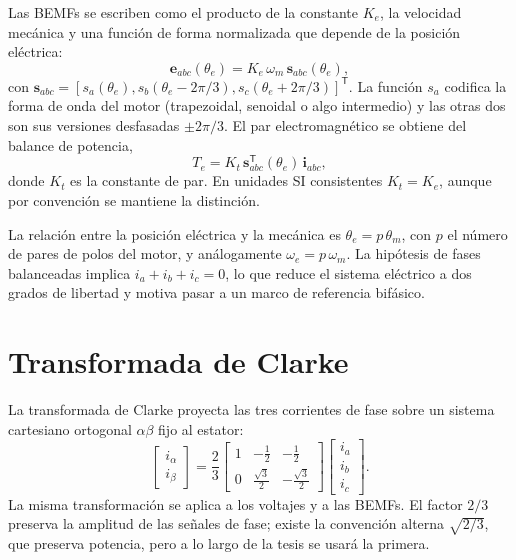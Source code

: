 \documentclass[../../../Tesis_JALS_Maestria.tex]{subfiles}
\begin{document}
Las BEMFs se escriben como el producto de la constante $K_e$, la velocidad mecánica y una función de forma normalizada que depende de la posición eléctrica:
\begin{equation}
    \mathbf{e}_{abc}(\theta_e) = K_e\,\omega_m\,\mathbf{s}_{abc}(\theta_e),
    \label{eq:bemf-abc}
\end{equation}
con $\mathbf{s}_{abc} = [s_a(\theta_e), s_b(\theta_e - 2\pi/3), s_c(\theta_e + 2\pi/3)]^{\mathsf T}$. La función $s_a$ codifica la forma de onda del motor (trapezoidal, senoidal o algo intermedio) y las otras dos son sus versiones desfasadas $\pm 2\pi/3$. El par electromagnético se obtiene del balance de potencia,
\begin{equation}
    T_e = K_t\,\mathbf{s}_{abc}^{\mathsf T}(\theta_e)\,\mathbf{i}_{abc},
    \label{eq:torque-abc}
\end{equation}
donde $K_t$ es la constante de par. En unidades SI consistentes $K_t = K_e$, aunque por convención se mantiene la distinción.

La relación entre la posición eléctrica y la mecánica es $\theta_e = p\,\theta_m$, con $p$ el número de pares de polos del motor, y análogamente $\omega_e = p\,\omega_m$. La hipótesis de fases balanceadas implica $i_a + i_b + i_c = 0$, lo que reduce el sistema eléctrico a dos grados de libertad y motiva pasar a un marco de referencia bifásico.

\section{Transformada de Clarke}
\label{sec:clarke}

La transformada de Clarke proyecta las tres corrientes de fase sobre un sistema cartesiano ortogonal $\alpha\beta$ fijo al estator:
\begin{equation}
    \begin{bmatrix} i_\alpha \\ i_\beta \end{bmatrix}
    = \frac{2}{3}
    \begin{bmatrix}
        1 & -\frac{1}{2} & -\frac{1}{2} \\[2pt]
        0 & \frac{\sqrt{3}}{2} & -\frac{\sqrt{3}}{2}
    \end{bmatrix}
    \begin{bmatrix} i_a \\ i_b \\ i_c \end{bmatrix}.
    \label{eq:clarke}
\end{equation}
La misma transformación se aplica a los voltajes y a las BEMFs. El factor $2/3$ preserva la amplitud de las señales de fase; existe la convención alterna $\sqrt{2/3}$, que preserva potencia, pero a lo largo de la tesis se usará la primera.
\end{document}
